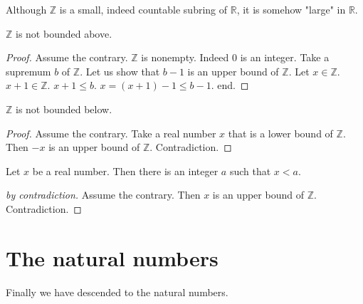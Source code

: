 \documentclass{article}
\begin{document}
%
Although $\mathbb{Z}$ is a small, indeed countable subring
of $\mathbb{R}$, it is somehow "large" in $\mathbb{R}$.
%
\begin{forthel}

\begin{theorem}[Archimedes1]
$\mathbb{Z}$ is not bounded above.
\end{theorem}
\begin{proof}
Assume the contrary.
$\mathbb{Z}$ is nonempty. Indeed $0$ is an integer.
Take a supremum
$b$ of $\mathbb{Z}$.
Let us show that $b - 1$ is an upper bound of $\mathbb{Z}$.
Let $x \in \mathbb{Z}$. $x + 1 \in \mathbb{Z}$.
$x + 1 \leq b$.
$x = (x + 1) - 1 \leq b - 1$.
end.
\end{proof}

\begin{theorem}
$\mathbb{Z}$ is not bounded below.
\end{theorem}
\begin{proof}
Assume the contrary.
Take a real number $x$ that is a lower bound of $\mathbb{Z}$.
Then $-x$ is an upper bound of $\mathbb{Z}$.
Contradiction.
\end{proof}

\begin{theorem}[Archimedes2]
Let $x$ be a real number.
Then there is an integer $a$
such that $x < a$.\end{theorem}
\begin{proof}[by contradiction]
Assume the contrary.
Then $x$ is an upper bound of $\mathbb{Z}$.
Contradiction.
\end{proof}

\end{forthel}

\section{The natural numbers}

Finally we have descended to the natural numbers.
\end{document}
